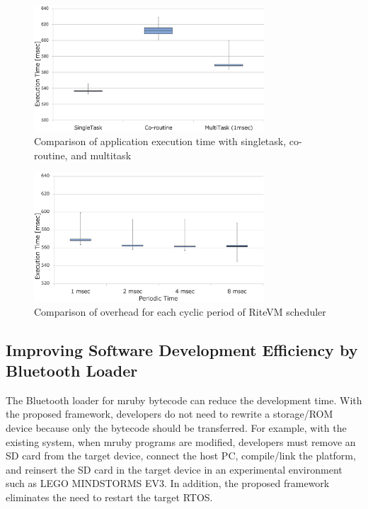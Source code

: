 \documentclass{sig-alternate-05-2015}
\begin{document}
\begin{figure}[t]
    \centering
    \includegraphics[width=8.6cm,clip]{figure/comparison_s_c_m.eps}
    \vspace{0.5mm}
\caption{Comparison of application execution time with singletask, co-routine, and multitask}
    \vspace{1mm}
\label{fig:comparison_s_c_m}
\end{figure}
\begin{figure}[t]
    \centering
    \includegraphics[width=8.6cm,clip]{figure/comparison_msec.eps}
    \vspace{0.5mm}
\caption{Comparison of overhead for each cyclic period of RiteVM scheduler}
    \vspace{1mm}
\label{fig:comparison_msec}
\end{figure}

\subsection{Improving Software Development Efficiency by Bluetooth Loader}
The Bluetooth loader for mruby bytecode can reduce the development time.
With the proposed framework, developers do not need to rewrite a storage/ROM device because only the bytecode should be transferred.
For example, with the existing system, when mruby programs are modified, developers must remove an SD card from the target device, connect the host PC, compile/link the platform, and reinsert the SD card in the target device in an experimental environment such as LEGO MINDSTORMS EV3.
In addition, the proposed framework eliminates the need to restart the target RTOS.
\end{document}
